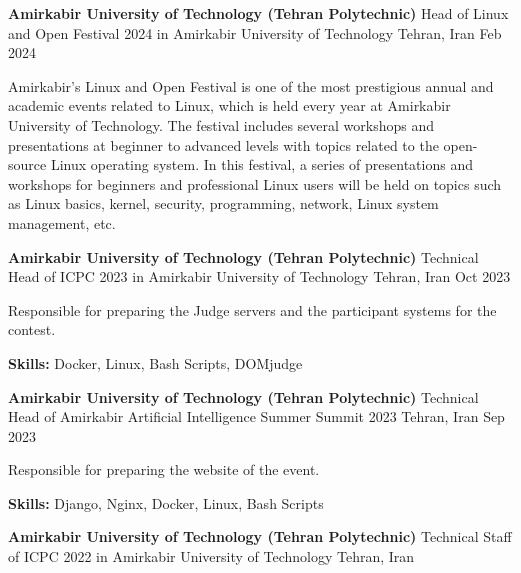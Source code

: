 \documentclass[]{awesome-cv}
\begin{document}
\begin{cventries}
    \cventry
	{\textbf{Amirkabir University of Technology (Tehran Polytechnic)}}
	{Head of Linux and Open Festival 2024 in Amirkabir University of Technology}
	{Tehran, Iran}
	{Feb 2024}
	{\begin{cvitems}
		\vspace{1mm}
        \item[]{Amirkabir's Linux and Open Festival is one of the most prestigious annual and academic events related to Linux, which is held every year at Amirkabir University of Technology. The festival includes several workshops and presentations at beginner to advanced levels with topics related to the open-source Linux operating system. In this festival, a series of presentations and workshops for beginners and professional Linux users will be held on topics such as Linux basics, kernel, security, programming, network, Linux system management, etc.}
	\end{cvitems}}
    \cventry
	{\textbf{Amirkabir University of Technology (Tehran Polytechnic)}}
	{Technical Head of ICPC 2023 in Amirkabir University of Technology}
	{Tehran, Iran}
	{Oct 2023}
	{\begin{cvitems}
		\vspace{1mm}
        \item{Responsible for preparing the Judge servers and the participant systems for the contest.}
        \vspace{1mm}
        \item{\textbf{Skills: }Docker, Linux, Bash Scripts, DOMjudge}
	\end{cvitems}}
    \cventry
	{\textbf{Amirkabir University of Technology (Tehran Polytechnic)}}
	{Technical Head of Amirkabir Artificial Intelligence Summer Summit 2023}
	{Tehran, Iran}
	{Sep 2023}
	{\begin{cvitems}
		\vspace{1mm}
        \item{Responsible for preparing the website of the event.}
        \vspace{1mm}
        \item{\textbf{Skills: }Django, Nginx, Docker, Linux, Bash Scripts}
	\end{cvitems}}
    \cventry
	{\textbf{Amirkabir University of Technology (Tehran Polytechnic)}}
	{Technical Staff of ICPC 2022 in Amirkabir University of Technology}
	{Tehran, Iran}

\end{cventries}
\end{document}
